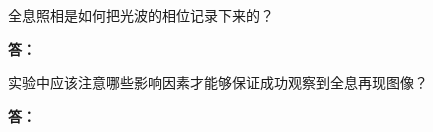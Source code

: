 \documentclass[dvipsnames, svgnames,a4paper,11pt]{article}
\newcommand{\answerblank}[1][3.8cm]{%
  \par\nopagebreak[4]\noindent\textbf{答：}\par\nopagebreak[4]\vspace*{#1}}
\begin{document}
\begin{question}
	全息照相是如何把光波的相位记录下来的？
\end{question}
\answerblank[3.8cm]

\begin{question}
	实验中应该注意哪些影响因素才能够保证成功观察到全息再现图像？
\end{question}
\answerblank[3.8cm]

\clearpage
{}
{}


\end{document}
